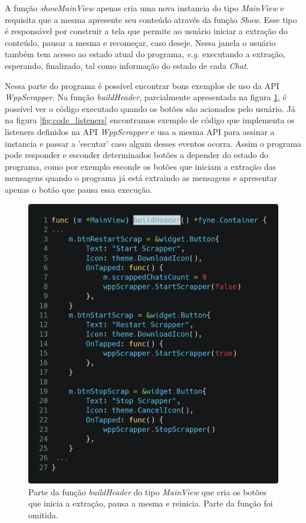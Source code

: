 A função \textit{showMainView} apenas cria uma nova instancia do tipo \textit{MainView} e requisita que a mesma apresente seu conteúdo através da função \textit{Show}. Esse tipo é responsável por construir a tela que permite ao usuário iniciar a extração do conteúdo, pausar a mesma e recomeçar, caso deseje. Nessa janela o usuário também tem acesso ao estado atual do programa, \textit{e.g.} executando a extração, esperando, finalizado, tal como informação do estado de cada \textit{Chat}.

Nessa parte do programa é possível encontrar bons exemplos de uso da API \textit{WppScrapper}. Na função \textit{buildHeader}, parcialmente apresentada na figura \ref{fig:code_buildHeader_btns}, é possível ver o código executado quando os botões são acionados pelo usuário. Já na figura \ref{fig:code_listeners} encontramos exemplo de código que implementa os listeners definidos na API \textit{WppScrapper} e usa a mesma API para assinar a instancia e passar a 'escutar' caso algum desses eventos ocorra. Assim o programa pode responder e esconder determinados botões a depender do estado do programa, como por exemplo esconde os botões que iniciam a extração das mensagens quando o programa já está extraindo as mensagens e apresentar apenas o botão que pausa essa execução.

\begin{figure}[h!]
    \includegraphics[width=\textwidth]{img/code_buildHeader_btns.png}
    \caption{Parte da função \textit{buildHeader} do tipo \textit{MainView} que cria os botões que inicia a extração, pausa a mesma e reinicia. Parte da função foi omitida.}
    \centering
    \label{fig:code_buildHeader_btns}
\end{figure}

